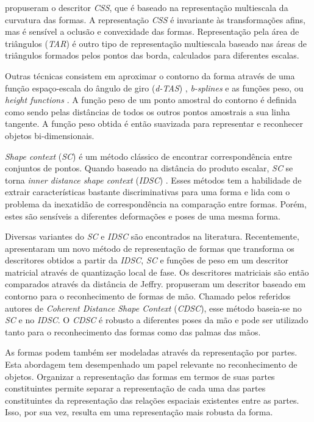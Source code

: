  propuseram o descritor \textit{CSS}, que é baseado na representação multiescala da curvatura das formas. A representação \textit{CSS} é invariante às transformações afins, mas é sensível a oclusão e convexidade das formas. Representação pela área de triângulos (\textit{TAR}) \cite{Alajlan20117} é outro tipo de representação multiescala baseado nas áreas de triângulos formados pelos pontos das borda, calculados para diferentes escalas. 

Outras técnicas consistem em aproximar o contorno da forma através de uma função espaço-escala do ângulo de giro (\textit{d-TAS}) \cite{4202050}, \textit{b-splines} \cite{1168520} e as funções peso, ou \textit{height functions} \cite{Wang2012134}. A função peso de um ponto amostral do contorno é definida como sendo pelas distâncias de todos os outros pontos amostrais a sua linha tangente. A função peso obtida é então suavizada para representar e reconhecer objetos bi-dimensionais.

\textit{Shape context} (\textit{SC}) \cite{Belongie:2002} é um método clássico de encontrar correspondência entre conjuntos de pontos. Quando baseado na distância do produto escalar, \textit{SC} se torna \textit{inner distance shape context} (\textit{IDSC}) \cite{1467513}. Esses métodos tem a habilidade de extrair características bastante discriminativas para uma forma e lida com o problema da inexatidão de correspondência na comparação entre formas. Porém, estes são sensíveis a diferentes deformações e poses de uma mesma forma.

Diversas variantes do \textit{SC} e \textit{IDSC} são encontrados na literatura. Recentemente,  apresentaram um novo método de representação de formas que transforma os descritores obtidos a partir da \textit{IDSC}, \textit{SC} e funções de peso em um descritor matricial através de quantização local de fase. Os descritores matriciais são então comparados através da distância de Jeffry.  propuseram um descritor baseado em contorno para o reconhecimento de formas de mão. Chamado pelos referidos autores de \textit{Coherent Distance Shape Context} (\textit{CDSC}), esse método baseia-se no \textit{SC} e no \textit{IDSC}. O \textit{CDSC} é robusto a diferentes poses da mão e pode ser utilizado tanto para o reconhecimento das formas como das palmas das mãos.  

As formas podem também ser modeladas através da representação por partes. Esta abordagem tem desempenhado um papel relevante no reconhecimento de objetos. Organizar a representação das formas em termos de suas partes constituintes permite separar a representação de cada uma das partes constituintes da representação das relações espaciais existentes entre as partes. Isso, por sua vez, resulta em uma representação mais robusta da forma. 

